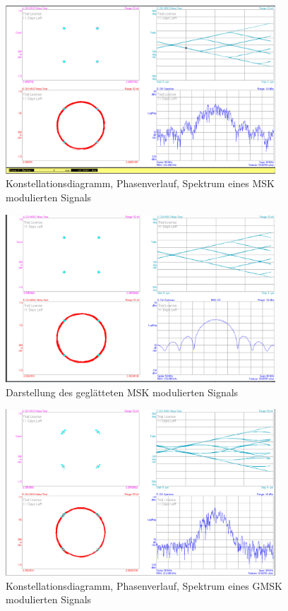 \documentclass[12pt,a4paper,ngerman]{article}
\begin{document}
\pagebreak
\begin{figure}[H]
\centering
\includegraphics[width=0.9\textwidth]{figures/Aufgabe3_MSK.jpg} 
\caption{Konstellationsdiagramm, Phasenverlauf, Spektrum eines MSK modulierten Signals}
\label{fig:3_MSK}
\end{figure}

\begin{figure}[H]
\centering
\includegraphics[width=0.9\textwidth]{figures/Aufgabe3_MSK_avg.jpg} 
\caption{Darstellung des geglätteten MSK modulierten Signals}
\label{fig:3_MSK_avg}
\end{figure}

\pagebreak
\begin{figure}[H]
\centering
\includegraphics[width=0.9\textwidth]{figures/Aufgabe3_GMSK.jpg} 
\caption{Konstellationsdiagramm, Phasenverlauf, Spektrum eines GMSK modulierten Signals}
\label{fig:3_GMSK}
\end{figure}
\end{document}
